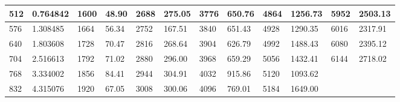 \begin{table}[H]
\begin{center}
{\begin{tabular}{|l|l|l|l|l|l|l|l|l|l|l|l|}
512                                                  & 0.764842 & 1600                                                 & 48.90  & 2688                                                 & 275.05 & 3776                                                 & 650.76 & 4864                                                 & 1256.73 & 5952                                                 & 2503.13 \\ \hline
576                                                  & 1.308485 & 1664                                                 & 56.34  & 2752                                                 & 167.51 & 3840                                                 & 651.43 & 4928                                                 & 1290.35 & 6016                                                 & 2317.91 \\ \hline
640                                                  & 1.803608 & 1728                                                 & 70.47  & 2816                                                 & 268.64 & 3904                                                 & 626.79 & 4992                                                 & 1488.43 & 6080                                                 & 2395.12 \\ \hline
704                                                  & 2.516613 & 1792                                                 & 71.02  & 2880                                                 & 296.00 & 3968                                                 & 659.29 & 5056                                                 & 1432.41 & 6144                                                 & 2718.02 \\ \hline
768                                                  & 3.334002 & 1856                                                 & 84.41  & 2944                                                 & 304.91 & 4032                                                 & 915.86 & 5120                                                 & 1093.62 &                                                      &         \\ \hline
832                                                  & 4.315076 & 1920                                                 & 67.05  & 3008                                                 & 300.06 & 4096                                                 & 769.01 & 5184                                                 & 1649.00 &                                                      &         \\ \hline

\end{tabular}}
\end{center}
\end{table}
